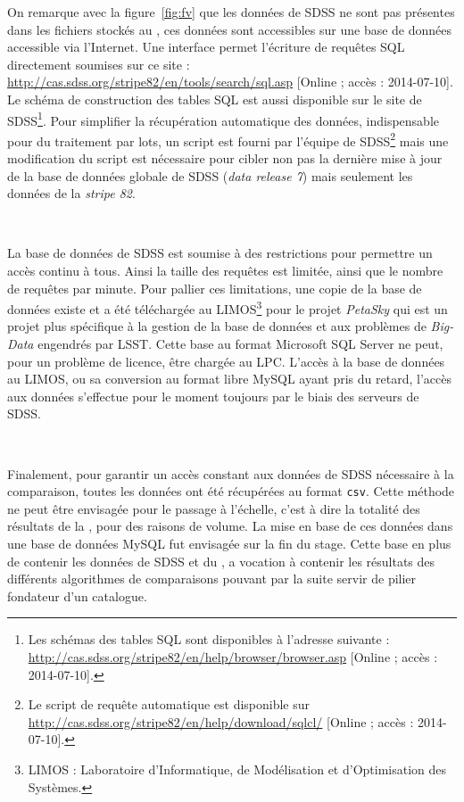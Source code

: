 On remarque avec la figure~\ref{fig:fv} que les données de SDSS ne sont pas présentes dans les fichiers stockés au \CC{}, ces données sont accessibles sur une base de données accessible via l'Internet. Une interface permet l'écriture de requêtes SQL directement soumises sur ce site : \url{http://cas.sdss.org/stripe82/en/tools/search/sql.asp} [Online ; accès : 2014-07-10]. Le schéma de construction des tables SQL est aussi disponible sur le site de SDSS\footnote{Les schémas des tables SQL sont disponibles à l'adresse suivante : \url{http://cas.sdss.org/stripe82/en/help/browser/browser.asp} [Online ; accès : 2014-07-10].}. Pour simplifier la récupération automatique des données, indispensable pour du traitement par lots, un script \Python{} est fourni par l'équipe de SDSS\footnote{Le script de requête automatique est disponible sur \url{http://cas.sdss.org/stripe82/en/help/download/sqlcl/} [Online ; accès : 2014-07-10].} mais une modification du script est nécessaire pour cibler non pas la dernière mise à jour de la base de données globale de SDSS (\emph{data release 7}) mais seulement les données de la \emph{stripe 82}.

\

La base de données de SDSS est soumise à des restrictions pour permettre un accès continu à tous. Ainsi la taille des requêtes est limitée, ainsi que le nombre de requêtes par minute. Pour pallier ces limitations, une copie de la base de données existe et a été téléchargée au LIMOS\footnote{LIMOS : Laboratoire d’Informatique, de Modélisation et d’Optimisation des Systèmes.} pour le projet \emph{PetaSky} qui est un projet plus spécifique à la gestion de la base de données et aux problèmes de \emph{Big-Data} engendrés par LSST. Cette base au format Microsoft SQL Server ne peut, pour un problème de licence, être chargée au LPC. L'accès à la base de données au LIMOS, ou sa conversion au format libre MySQL ayant pris du retard, l'accès aux données s'effectue pour le moment toujours par le biais des serveurs de SDSS.

\

Finalement, pour garantir un accès constant aux données de SDSS nécessaire à la comparaison, toutes les données ont été récupérées au format \texttt{csv}. Cette méthode ne peut être envisagée pour le passage à l'échelle, c'est à dire la totalité des résultats de la \DC{}, pour des raisons de volume. La mise en base de ces données dans une base de données MySQL fut envisagée sur la fin du stage. Cette base en plus de contenir les données de SDSS et du \stack{}, a vocation à contenir les résultats des différents algorithmes de comparaisons pouvant par la suite servir de pilier fondateur d'un catalogue.


